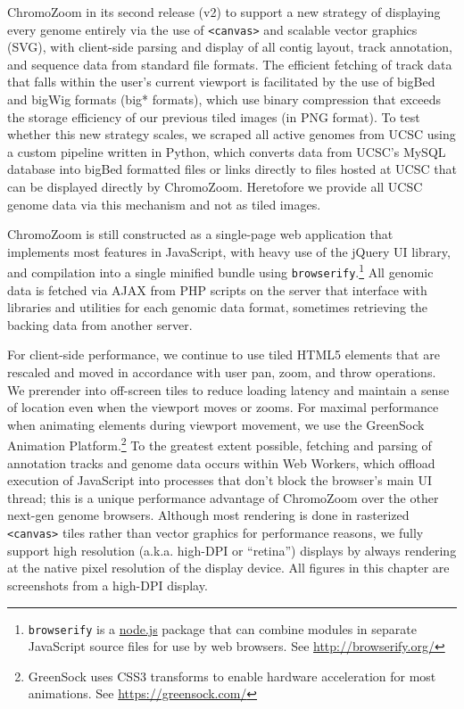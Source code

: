  ChromoZoom in its second release (v2) to support a new strategy of displaying every genome entirely via the use of \texttt{<canvas>} and scalable vector graphics (SVG), with client-side parsing and display of all contig layout, track annotation, and sequence data from standard file formats. The efficient fetching of track data that falls within the user's current viewport is facilitated by the use of bigBed and bigWig formats (big* formats),\autocite{Kent2010} which use binary compression that exceeds the storage efficiency of our previous tiled images (in PNG format). To test whether this new strategy scales, we scraped all active genomes from UCSC using a custom pipeline written in Python, which converts data from UCSC's MySQL database into bigBed formatted files or links directly to files hosted at UCSC that can be displayed directly by ChromoZoom. Heretofore we provide all UCSC genome data via this mechanism and not as tiled images.

ChromoZoom is still constructed as a single-page web application that implements most features in JavaScript, with heavy use of the jQuery UI library, and compilation into a single minified bundle using \texttt{browserify}.\footnote{\texttt{browserify} is a \href{https://nodejs.org/}{node.js} package that can combine modules in separate JavaScript source files for use by web browsers. See \url{http://browserify.org/}} All genomic data is fetched via AJAX from PHP scripts on the server that interface with libraries and utilities for each genomic data format, sometimes retrieving the backing data from another server.

For client-side performance, we continue to use tiled HTML5 elements that are rescaled and moved in accordance with user pan, zoom, and throw operations. We prerender into off-screen tiles to reduce loading latency and maintain a sense of location even when the viewport moves or zooms. For maximal performance when animating elements during viewport movement, we use the GreenSock Animation Platform.\footnote{GreenSock uses CSS3 transforms to enable hardware acceleration for most animations. See \url{https://greensock.com/}} To the greatest extent possible, fetching and parsing of annotation tracks and genome data occurs within Web Workers, which offload execution of JavaScript into processes that don't block the browser's main UI thread; this is a unique performance advantage of ChromoZoom over the other next-gen genome browsers.\autocite{Buels2016,Down2011,Vanderkam2016} Although most rendering is done in rasterized \texttt{<canvas>} tiles rather than vector graphics for performance reasons, we fully support high resolution (a.k.a. high-DPI or ``retina'') displays by always rendering at the native pixel resolution of the display device. All figures in this chapter are screenshots from a high-DPI display.

